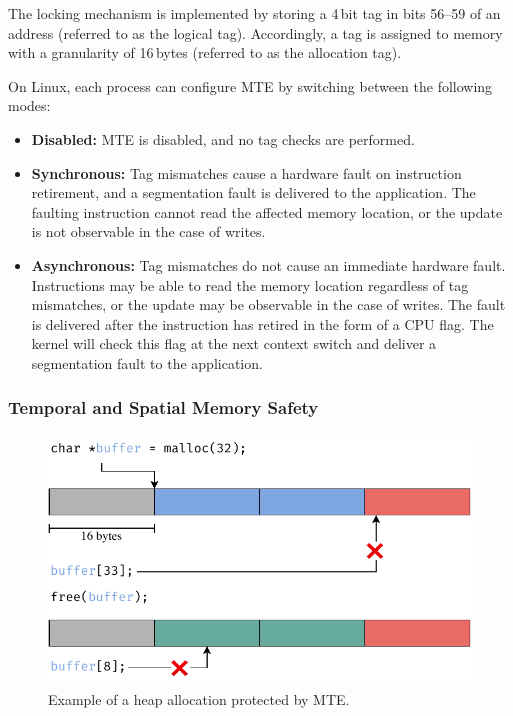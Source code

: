 The locking mechanism is implemented by storing a 4\,bit tag in bits 56--59 of an address (referred to as the logical tag).
Accordingly, a tag is assigned to memory with a granularity of 16\,bytes (referred to as the allocation tag).

On Linux, each process can configure \ac{MTE} by switching between the following modes:
\begin{itemize}
    \item \textbf{Disabled:} \ac{MTE} is disabled, and no tag checks are performed.
    \item \textbf{Synchronous:}
    Tag mismatches cause a hardware fault on instruction retirement, and a segmentation fault is delivered to the application.
    The faulting instruction cannot read the affected memory location, or the update is not observable in the case of writes.
    \item \textbf{Asynchronous:}
    Tag mismatches do not cause an immediate hardware fault.
    Instructions may be able to read the memory location regardless of tag mismatches, or the update may be observable in the case of writes.
    The fault is delivered after the instruction has retired in the form of a CPU flag.
    The kernel will check this flag at the next context switch and deliver a segmentation fault to the application.
\end{itemize}


\subsubsection{Temporal and Spatial Memory Safety}

\begin{figure}[t]
    \centering
    \includegraphics[scale=1]{figures/build/mte}
    \caption{Example of a heap allocation protected by \ac{MTE}.}
    \label{fig:mte}
\end{figure}

